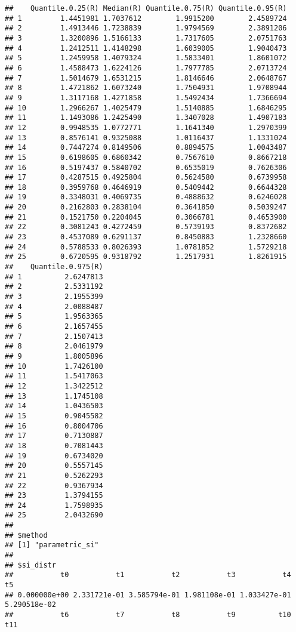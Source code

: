 \documentclass[
]{article}
\begin{document}
\begin{verbatim}
##    Quantile.0.25(R) Median(R) Quantile.0.75(R) Quantile.0.95(R)
## 1         1.4451981 1.7037612        1.9915200        2.4589724
## 2         1.4913446 1.7238839        1.9794569        2.3891206
## 3         1.3200896 1.5166133        1.7317605        2.0751763
## 4         1.2412511 1.4148298        1.6039005        1.9040473
## 5         1.2459958 1.4079324        1.5833401        1.8601072
## 6         1.4588473 1.6224126        1.7977785        2.0713724
## 7         1.5014679 1.6531215        1.8146646        2.0648767
## 8         1.4721862 1.6073240        1.7504931        1.9708944
## 9         1.3117168 1.4271858        1.5492434        1.7366694
## 10        1.2966267 1.4025479        1.5140885        1.6846295
## 11        1.1493086 1.2425490        1.3407028        1.4907183
## 12        0.9948535 1.0772771        1.1641340        1.2970399
## 13        0.8576141 0.9325088        1.0116437        1.1331024
## 14        0.7447274 0.8149506        0.8894575        1.0043487
## 15        0.6198605 0.6860342        0.7567610        0.8667218
## 16        0.5197437 0.5840702        0.6535019        0.7626306
## 17        0.4287515 0.4925804        0.5624580        0.6739958
## 18        0.3959768 0.4646919        0.5409442        0.6644328
## 19        0.3348031 0.4069735        0.4888632        0.6246028
## 20        0.2162803 0.2838104        0.3641850        0.5039247
## 21        0.1521750 0.2204045        0.3066781        0.4653900
## 22        0.3081243 0.4272459        0.5739193        0.8372682
## 23        0.4537089 0.6291137        0.8450883        1.2328660
## 24        0.5788533 0.8026393        1.0781852        1.5729218
## 25        0.6720595 0.9318792        1.2517931        1.8261915
##    Quantile.0.975(R)
## 1          2.6247813
## 2          2.5331192
## 3          2.1955399
## 4          2.0088487
## 5          1.9563365
## 6          2.1657455
## 7          2.1507413
## 8          2.0461979
## 9          1.8005896
## 10         1.7426100
## 11         1.5417063
## 12         1.3422512
## 13         1.1745108
## 14         1.0436503
## 15         0.9045582
## 16         0.8004706
## 17         0.7130887
## 18         0.7081443
## 19         0.6734020
## 20         0.5557145
## 21         0.5262293
## 22         0.9367934
## 23         1.3794155
## 24         1.7598935
## 25         2.0432690
## 
## $method
## [1] "parametric_si"
## 
## $si_distr
##           t0           t1           t2           t3           t4           t5 
## 0.000000e+00 2.331721e-01 3.585794e-01 1.981108e-01 1.033427e-01 5.290518e-02 
##           t6           t7           t8           t9          t10          t11 

\end{verbatim}
\end{document}
